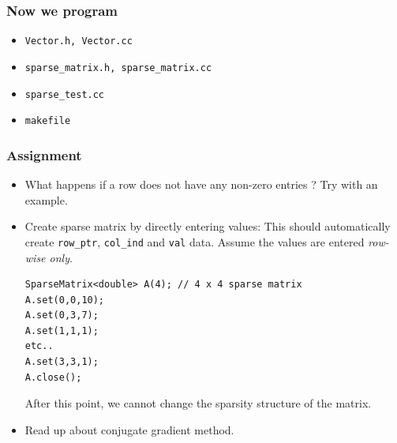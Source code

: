 \documentclass[10pt,xcolor=svgnames]{beamer}
\begin{document}
\begin{frame}
\frametitle{Now we program}

\begin{itemize}
\item {\tt Vector.h, Vector.cc}
\item {\tt sparse\_matrix.h, sparse\_matrix.cc}
\item {\tt sparse\_test.cc}
\item {\tt makefile}
\end{itemize}

\end{frame}
\begin{frame}[fragile]
\frametitle{Assignment}

\begin{itemize}

\item What happens if a row does not have any non-zero entries ? Try with an example.

\item Create sparse matrix by directly entering values: This should automatically create {\tt row\_ptr}, {\tt col\_ind} and {\tt val} data. Assume the values are entered {\em row-wise only}.
\begin{lstlisting}
SparseMatrix<double> A(4); // 4 x 4 sparse matrix
A.set(0,0,10);
A.set(0,3,7);
A.set(1,1,1);
etc..
A.set(3,3,1);
A.close();
\end{lstlisting}
After this point, we cannot change the sparsity structure of the matrix.
\item Read up about conjugate gradient method.
\end{itemize}

\end{frame}
\end{document}
